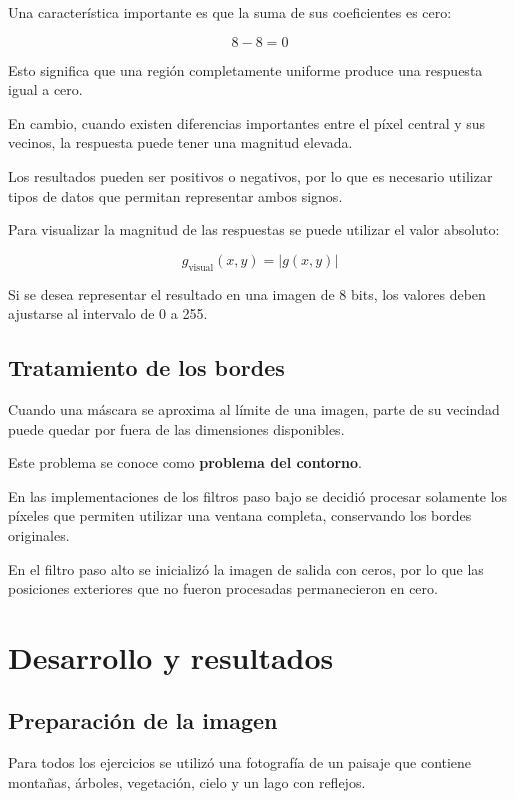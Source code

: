 \documentclass[11pt,letterpaper]{article}
\begin{document}
Una característica importante es que
la suma de sus coeficientes es cero:

\[
8-8=0
\]

Esto significa que una región completamente
uniforme produce una respuesta igual a cero.

En cambio, cuando existen diferencias importantes
entre el píxel central y sus vecinos,
la respuesta puede tener una magnitud elevada.

Los resultados pueden ser positivos o negativos,
por lo que es necesario utilizar tipos de datos
que permitan representar ambos signos.

Para visualizar la magnitud de las respuestas
se puede utilizar el valor absoluto:

\[
g_{\text{visual}}(x,y)=|g(x,y)|
\]

Si se desea representar el resultado en
una imagen de 8 bits, los valores deben
ajustarse al intervalo de 0 a 255.

\subsection{Tratamiento de los bordes}

Cuando una máscara se aproxima al límite
de una imagen, parte de su vecindad puede
quedar por fuera de las dimensiones disponibles.

Este problema se conoce como
\textbf{problema del contorno}.

En las implementaciones de los filtros paso bajo
se decidió procesar solamente los píxeles
que permiten utilizar una ventana completa,
conservando los bordes originales.

En el filtro paso alto se inicializó la imagen
de salida con ceros, por lo que las posiciones
exteriores que no fueron procesadas
permanecieron en cero.

\section{Desarrollo y resultados}

\subsection{Preparación de la imagen}

Para todos los ejercicios se utilizó una fotografía
de un paisaje que contiene montañas, árboles,
vegetación, cielo y un lago con reflejos.
\end{document}
